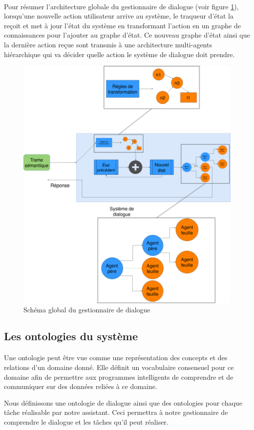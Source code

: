 \paragraph{}
Pour résumer l'architecture globale du gestionnaire de dialogue (voir figure \ref{globalDM}), lorsqu'une nouvelle action utilisateur arrive au système, le traqueur d'état la reçoit et met à jour l'état du système en transformant l'action en un graphe de connaissances pour l'ajouter au graphe d'état. Ce nouveau graphe d'état ainsi que la dernière action reçue sont transmis à une architecture multi-agents hiérarchique qui va décider quelle action le système de dialogue doit prendre.
\begin{figure}[H] 
	
	\centering
	\includegraphics[width=0.88\linewidth]{images/Conception/DM/globalDM.png}
	\caption{Schéma global du gestionnaire de dialogue}\label{globalDM}
\end{figure}
\subsection{Les ontologies du système}\label{onto}
\paragraph{}Une ontologie peut être vue comme une représentation des concepts et des relations d'un domaine donné. Elle définit un vocabulaire consensuel pour ce domaine afin de permettre aux programmes intelligents de comprendre  et de communiquer sur des données reliées à ce domaine.
\par Nous définissons une ontologie de dialogue ainsi que des ontologies pour chaque tâche réalisable par notre assistant. Ceci permettra à notre gestionnaire de comprendre le dialogue et les tâches qu'il peut réaliser.
